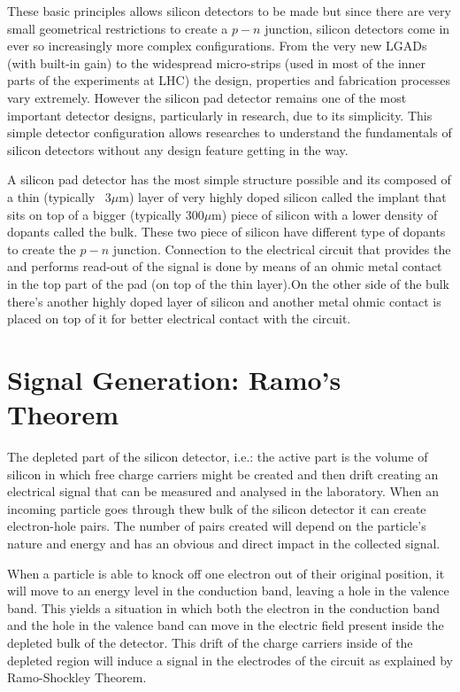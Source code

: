 These basic principles allows silicon detectors to be made but since there are very small geometrical restrictions to create a $p-n$ junction, silicon detectors come in ever so increasingly more complex configurations. From the very new LGADs (with built-in gain) to the widespread micro-strips (used in most of the inner parts of the experiments at LHC) the design, properties and fabrication processes vary extremely. However the silicon pad detector remains one of the most important detector designs, particularly in research, due to its simplicity. This simple detector configuration allows researches to understand the fundamentals of silicon detectors without any design feature getting in the way. 

A silicon pad detector has the most simple structure possible and its composed of a thin (typically ~3$\mu$m) layer of very highly doped silicon called the implant that sits on top of a bigger (typically 300$\mu$m) piece of silicon with a lower density of dopants called the bulk. These two piece of silicon have different type of dopants to create the $p-n$ junction. Connection to the electrical circuit that provides the \vias and performs read-out of the signal is done by means of an ohmic metal contact in the top part of the pad (on top of the thin layer).On the other side of the bulk there's another highly doped layer of silicon and another metal ohmic contact is placed on top of it for better electrical contact with the circuit.

\section{Signal Generation: Ramo's Theorem} %

The depleted part of the silicon detector, i.e.: the active part is the volume of silicon in which free charge carriers might be created and then drift creating an electrical signal that can be measured and analysed in the laboratory. When an incoming particle goes through thew bulk of the silicon detector it can create electron-hole pairs. The number of pairs created will depend on the particle's nature and energy and has an obvious and direct impact in the collected signal. 

When a particle is able to knock off one electron out of their original position, it will move to an energy level in the conduction band, leaving a hole in the valence band. This yields a situation in which both the electron in the conduction band and the hole in the valence band can move in the electric field present inside the depleted bulk of the detector. This drift of the charge carriers inside of the depleted region will induce a signal in the electrodes of the circuit as explained by Ramo-Shockley Theorem.

